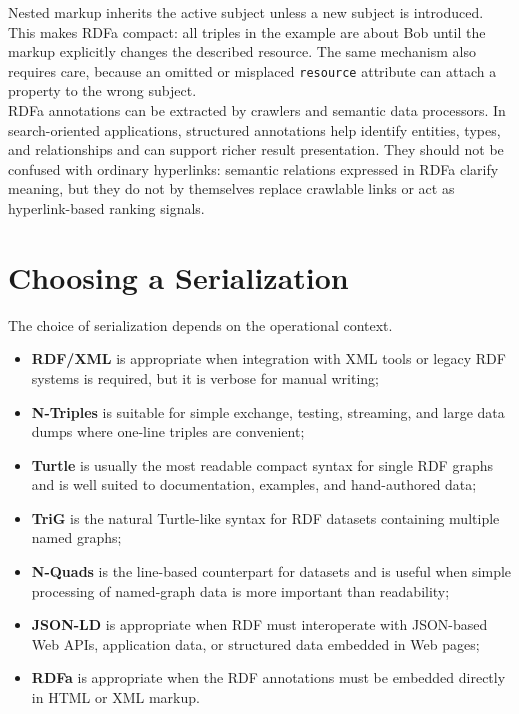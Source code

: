 \documentclass{scrbook}
\begin{document}
	Nested markup inherits the active subject unless a new subject is introduced. This makes RDFa compact: all triples in the example are about Bob until the markup explicitly changes the described resource. The same mechanism also requires care, because an omitted or misplaced \texttt{resource} attribute can attach a property to the wrong subject.\\
	
	RDFa annotations can be extracted by crawlers and semantic data processors. In search-oriented applications, structured annotations help identify entities, types, and relationships and can support richer result presentation. They should not be confused with ordinary hyperlinks: semantic relations expressed in RDFa clarify meaning, but they do not by themselves replace crawlable links or act as hyperlink-based ranking signals.
	
	\section{Choosing a Serialization}
	
	The choice of serialization depends on the operational context.
	
	\begin{itemize}
		\item \textbf{RDF/XML} is appropriate when integration with XML tools or legacy RDF systems is required, but it is verbose for manual writing;
		
		\item \textbf{N-Triples} is suitable for simple exchange, testing, streaming, and large data dumps where one-line triples are convenient;
		
		\item \textbf{Turtle} is usually the most readable compact syntax for single RDF graphs and is well suited to documentation, examples, and hand-authored data;
		
		\item \textbf{TriG} is the natural Turtle-like syntax for RDF datasets containing multiple named graphs;
		
		\item \textbf{N-Quads} is the line-based counterpart for datasets and is useful when simple processing of named-graph data is more important than readability;
		
		\item \textbf{JSON-LD} is appropriate when RDF must interoperate with JSON-based Web APIs, application data, or structured data embedded in Web pages;
		
		\item \textbf{RDFa} is appropriate when the RDF annotations must be embedded directly in HTML or XML markup.
	\end{itemize}
	
\end{document}

